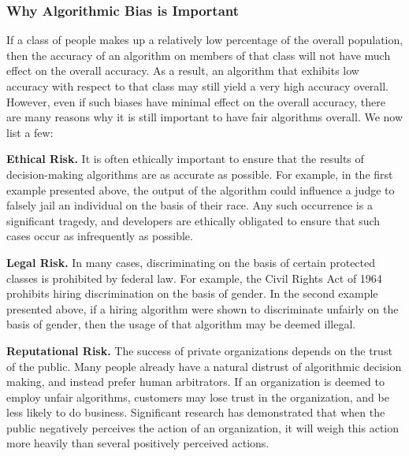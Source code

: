 \subsubsection{Why Algorithmic Bias is Important}
\par If a class of people makes up a relatively low percentage of the overall population, then the accuracy of an algorithm on members of that class will not have much effect on the overall accuracy. As a result, an algorithm that exhibits low accuracy with respect to that class may still yield a very high accuracy overall. However, even if such biases have minimal effect on the overall accuracy, there are many reasons why it is still important to have fair algorithms overall. We now list a few:


\par \textbf{Ethical Risk.} It is often ethically important to ensure that the results of decision-making algorithms are as accurate as possible. For example, in the first example presented above, the output of the algorithm could influence a judge to falsely jail an individual on the basis of their race. Any such occurrence is a significant tragedy, and developers are ethically obligated to ensure that such cases occur as infrequently as possible.
\par \textbf{Legal Risk.} In many cases, discriminating on the basis of certain protected classes is prohibited by federal law. For example, the Civil Rights Act of 1964 prohibits hiring discrimination on the basis of gender. In the second example presented above, if a hiring algorithm were shown to discriminate unfairly on the basis of gender, then the usage of that algorithm may be deemed illegal.
\par \textbf{Reputational Risk.} The success of private organizations depends on the trust of the public. Many people already have a natural distrust of algorithmic decision making, and instead prefer human arbitrators. If an organization is deemed to employ unfair algorithms, customers may lose trust in the organization, and be less likely to do business. Significant research has demonstrated that when the public negatively perceives the action of an organization, it will weigh this action more heavily than several positively perceived actions.

